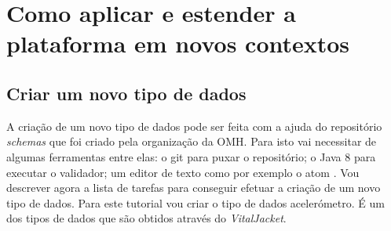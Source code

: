 \section{Como aplicar e estender a plataforma em novos contextos}


\subsection{Criar um novo tipo de dados}

A criação de um novo tipo de dados pode ser feita com a ajuda do repositório \textit{schemas} \cite{schemas-rep} que foi criado pela organização da \gls{OMH}. Para isto vai necessitar de algumas ferramentas entre elas: o git \cite{git-install} para puxar o repositório; o Java 8 \cite{java-overview} para executar o validador; um editor de texto como por exemplo o atom \cite{atom-install}. Vou descrever agora a lista de tarefas para conseguir efetuar a criação de um novo tipo de dados. Para este tutorial vou criar o tipo de dados acelerómetro. É um dos tipos de dados que são obtidos através do \textit{VitalJacket}.

